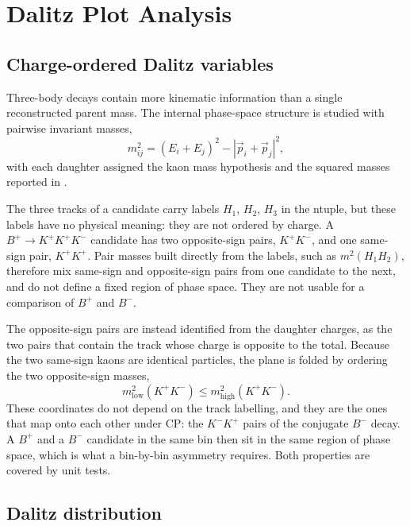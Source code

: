 \section{Dalitz Plot Analysis}

\subsection{Charge-ordered Dalitz variables}

Three-body decays contain more kinematic information than a single reconstructed parent mass. The internal phase-space structure is studied with pairwise invariant masses,
\begin{equation}
  m_{ij}^2 =
  \left(E_i + E_j\right)^2
  -
  \left|\vec{p}_i + \vec{p}_j\right|^2 ,
\end{equation}
with each daughter assigned the kaon mass hypothesis and the squared masses reported in \gevfour{}.

The three tracks of a candidate carry labels $H_1$, $H_2$, $H_3$ in the ntuple, but these labels have no physical meaning: they are not ordered by charge. A $B^+ \to K^+K^+K^-$ candidate has two opposite-sign pairs, $K^+K^-$, and one same-sign pair, $K^+K^+$. Pair masses built directly from the labels, such as $m^2(H_1H_2)$, therefore mix same-sign and opposite-sign pairs from one candidate to the next, and do not define a fixed region of phase space. They are not usable for a comparison of $B^+$ and $B^-$.

The opposite-sign pairs are instead identified from the daughter charges, as the two pairs that contain the track whose charge is opposite to the total. Because the two same-sign kaons are identical particles, the plane is folded by ordering the two opposite-sign masses,
\begin{equation}
  m^2_{\mathrm{low}}(K^+K^-) \le m^2_{\mathrm{high}}(K^+K^-) .
\end{equation}
These coordinates do not depend on the track labelling, and they are the ones that map onto each other under CP: the $K^-K^+$ pairs of the conjugate $B^-$ decay. A $B^+$ and a $B^-$ candidate in the same bin then sit in the same region of phase space, which is what a bin-by-bin asymmetry requires. Both properties are covered by unit tests.

\subsection{Dalitz distribution}

